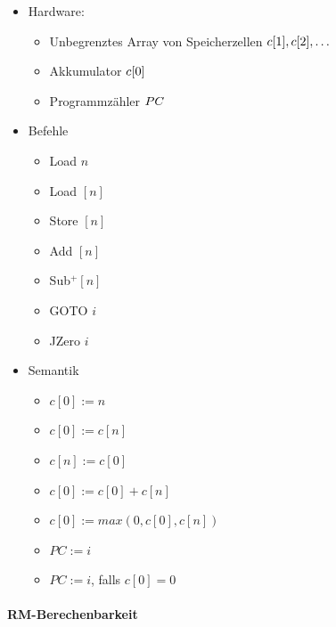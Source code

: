 \documentclass{scrartcl}
\begin{document}
\begin{itemize}
	\item Hardware:
	\begin{itemize}
		\item Unbegrenztes Array von Speicherzellen $\hfill c[1],c[2],\ldots$
		\item Akkumulator $\hfill c[0]$
		\item Programmzähler $\hfill PC$
	\end{itemize}
	\item Befehle
	\begin{itemize}
		\item Load $n$
		\item Load $[n]$
		\item Store $[n]$
		\item Add $[n]$
		\item Sub$^+ [n]$
		\item GOTO $i$
		\item JZero $i$
	\end{itemize}
	\item Semantik
	\begin{itemize}
		\item $c[0] := n$
		\item $c[0] := c[n]$
		\item $c[n] := c[0]$
		\item $c[0] := c[0]+c[n]$
		\item $c[0] := max(0,c[0],c[n])$
		\item $PC := i$
		\item $PC := i$, falls $c[0] = 0$
	\end{itemize}
\end{itemize}

\paragraph{RM-Berechenbarkeit}
\end{document}

